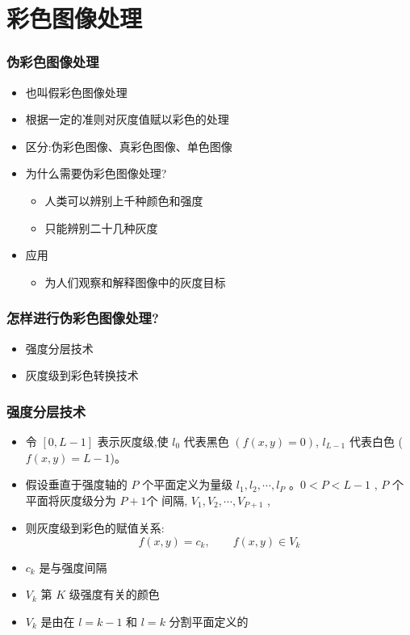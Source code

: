 \documentclass{beamer}
\begin{document}
\section{彩色图像处理}
\label{sec-4}
\begin{frame}
\frametitle{伪彩色图像处理}
\label{sec-4-1}


\begin{itemize}
\item 也叫假彩色图像处理
\item 根据一定的准则对灰度值赋以彩色的处理
\item 区分:伪彩色图像、真彩色图像、单色图像
\item 为什么需要伪彩色图像处理?
\begin{itemize}
\item 人类可以辨别上千种颜色和强度
\item 只能辨别二十几种灰度
\end{itemize}
\item 应用
\begin{itemize}
\item 为人们观察和解释图像中的灰度目标
\end{itemize}
\end{itemize}
\end{frame}
\begin{frame}
\frametitle{怎样进行伪彩色图像处理?}
\label{sec-4-2}

\begin{itemize}
\item 强度分层技术
\item 灰度级到彩色转换技术
\end{itemize}
\end{frame}
\begin{frame}
\frametitle{强度分层技术}
\label{sec-4-3}

\begin{itemize}
\item 令 $[0,L-1]$ 表示灰度级,使 $l_0$ 代表黑色 $(f(x,y)=0)$, $l_{L-1}$ 代表白色 ($f(x,y)=L-1$)。
\item 假设垂直于强度轴的 $P$ 个平面定义为量级 $l_1,l_2,\cdots,l_P$ 。$0<P<L-1$ , $P$ 个平面将灰度级分为 $P+1个$ 间隔, $V_1,V_2,\cdots,V_{P+1}$ ,
\item 则灰度级到彩色的赋值关系:
   \[ f(x,y)=c_k,  \qquad f(x,y)\in V_k \]
\item $c_k$ 是与强度间隔
\item $V_k$ 第 $K$ 级强度有关的颜色
\item $V_k$ 是由在 $l=k-1$ 和 $l=k$ 分割平面定义的
\end{itemize}
\end{frame}
\end{document}
